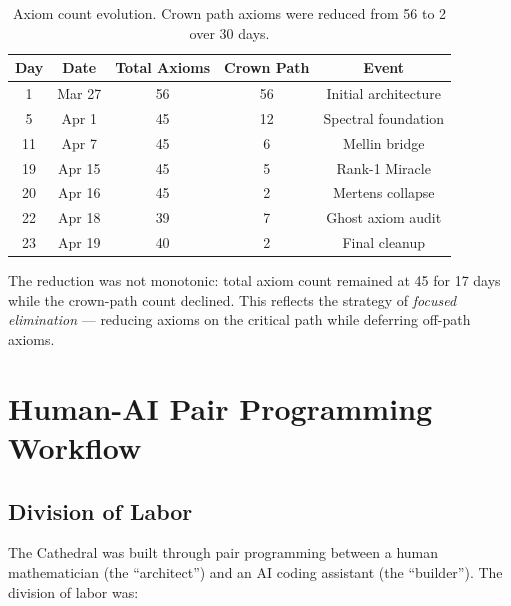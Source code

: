 \documentclass[11pt,a4paper]{article}
\begin{document}
\begin{table}[h]
\centering
\begin{tabular}{@{}ccccc@{}}
\toprule
\textbf{Day} & \textbf{Date} & \textbf{Total Axioms} & \textbf{Crown Path} & \textbf{Event} \\
\midrule
1 & Mar 27 & 56 & 56 & Initial architecture \\
5 & Apr 1 & 45 & 12 & Spectral foundation \\
11 & Apr 7 & 45 & 6 & Mellin bridge \\
19 & Apr 15 & 45 & 5 & Rank-1 Miracle \\
20 & Apr 16 & 45 & 2 & Mertens collapse \\
22 & Apr 18 & 39 & 7 & Ghost axiom audit \\
23 & Apr 19 & 40 & 2 & Final cleanup \\
\bottomrule
\end{tabular}
\caption{Axiom count evolution. Crown path axioms were reduced
from 56 to 2 over 30 days.}
\label{tab:axiom-history}
\end{table}

The reduction was not monotonic: total axiom count remained at 45
for 17 days while the crown-path count declined. This reflects the
strategy of \emph{focused elimination} --- reducing axioms on the
critical path while deferring off-path axioms.

\section{Human-AI Pair Programming Workflow}
\label{sec:workflow}

\subsection{Division of Labor}

The Cathedral was built through pair programming between a human
mathematician (the ``architect'') and an AI coding assistant (the
``builder''). The division of labor was:
\end{document}
